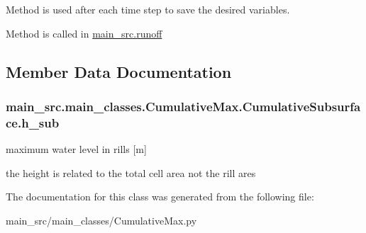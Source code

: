 Method is used after each time step to save the desired variables. 

Method is called in \hyperlink{namespacemain__src_1_1runoff}{main\-\_\-src.\-runoff} 

\subsection{Member Data Documentation}
\hypertarget{classmain__src_1_1main__classes_1_1CumulativeMax_1_1CumulativeSubsurface_aea842abf8b5f571caa5b550bb93b6a8d}{
\subsubsection[{h\-\_\-sub}]{\setlength{\rightskip}{0pt plus 5cm}main\-\_\-src.\-main\-\_\-classes.\-Cumulative\-Max.\-Cumulative\-Subsurface.\-h\-\_\-sub}}\label{classmain__src_1_1main__classes_1_1CumulativeMax_1_1CumulativeSubsurface_aea842abf8b5f571caa5b550bb93b6a8d}


maximum water level in rills \mbox{[}m\mbox{]} 

the height is related to the total cell area not the rill ares 

The documentation for this class was generated from the following file\-:\begin{DoxyCompactItemize}
\item 
main\-\_\-src/main\-\_\-classes/Cumulative\-Max.\-py\end{DoxyCompactItemize}
